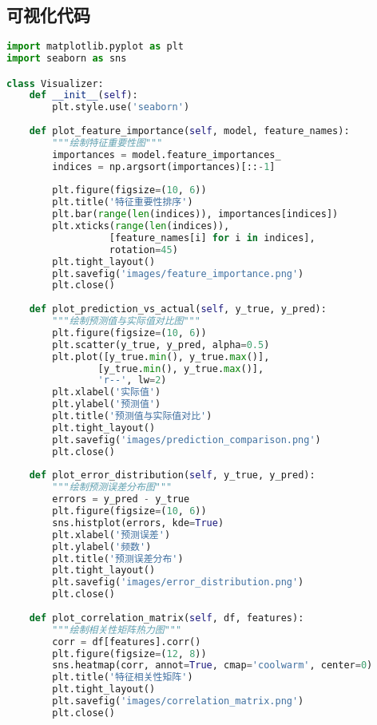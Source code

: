 \subsection{可视化代码}
\begin{lstlisting}[language=Python, caption=可视化实现, label=lst:visualization]
import matplotlib.pyplot as plt
import seaborn as sns

class Visualizer:
    def __init__(self):
        plt.style.use('seaborn')
        
    def plot_feature_importance(self, model, feature_names):
        """绘制特征重要性图"""
        importances = model.feature_importances_
        indices = np.argsort(importances)[::-1]
        
        plt.figure(figsize=(10, 6))
        plt.title('特征重要性排序')
        plt.bar(range(len(indices)), importances[indices])
        plt.xticks(range(len(indices)), 
                  [feature_names[i] for i in indices], 
                  rotation=45)
        plt.tight_layout()
        plt.savefig('images/feature_importance.png')
        plt.close()
    
    def plot_prediction_vs_actual(self, y_true, y_pred):
        """绘制预测值与实际值对比图"""
        plt.figure(figsize=(10, 6))
        plt.scatter(y_true, y_pred, alpha=0.5)
        plt.plot([y_true.min(), y_true.max()], 
                [y_true.min(), y_true.max()], 
                'r--', lw=2)
        plt.xlabel('实际值')
        plt.ylabel('预测值')
        plt.title('预测值与实际值对比')
        plt.tight_layout()
        plt.savefig('images/prediction_comparison.png')
        plt.close()
    
    def plot_error_distribution(self, y_true, y_pred):
        """绘制预测误差分布图"""
        errors = y_pred - y_true
        plt.figure(figsize=(10, 6))
        sns.histplot(errors, kde=True)
        plt.xlabel('预测误差')
        plt.ylabel('频数')
        plt.title('预测误差分布')
        plt.tight_layout()
        plt.savefig('images/error_distribution.png')
        plt.close()
    
    def plot_correlation_matrix(self, df, features):
        """绘制相关性矩阵热力图"""
        corr = df[features].corr()
        plt.figure(figsize=(12, 8))
        sns.heatmap(corr, annot=True, cmap='coolwarm', center=0)
        plt.title('特征相关性矩阵')
        plt.tight_layout()
        plt.savefig('images/correlation_matrix.png')
        plt.close()
\end{lstlisting}

